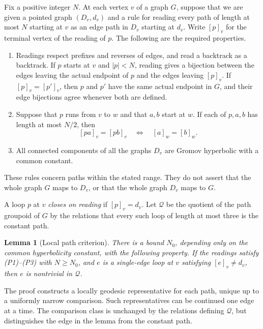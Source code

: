 \documentclass[11pt,reqno]{amsart}
\numberwithin{equation}{section}
\newtheorem{lemma}[theorem]{Lemma}
\theoremstyle{definition}
\theoremstyle{remark}
\begin{document}
Fix a positive integer $N$.  At each vertex $v$ of a graph $G$, suppose that
we are given a pointed graph $(D_v,d_v)$ and a rule for reading every path
of length at most $N$ starting at $v$ as an edge path in $D_v$ starting at
$d_v$.  Write $[p]_v$ for the terminal vertex of the reading of $p$.
The following are the required properties.
\begin{enumerate}
\item[\textnormal{(P1)}] Readings respect prefixes and reverses of edges,
and read a backtrack as a backtrack.  If $p$ starts at $v$ and $|p|<N$,
reading gives a bijection between the edges leaving the actual endpoint of
$p$ and the edges leaving $[p]_v$.  If $[p]_v=[p']_v$, then $p$ and $p'$
have the same actual endpoint in $G$, and their edge bijections agree
whenever both are defined.
\item[\textnormal{(P2)}] Suppose that $p$ runs from $v$ to $w$ and that
$a,b$ start at $w$.  If each of $p,a,b$ has length at most $N/2$, then
\begin{equation}\label{path:change-root}
 [pa]_v=[pb]_v\quad\Longleftrightarrow\quad [a]_w=[b]_w.
\end{equation}
\item[\textnormal{(P3)}] All connected components of all the graphs $D_v$
are Gromov hyperbolic with a common constant.
\end{enumerate}
These rules concern paths within the stated range.  They do not assert
that the whole graph $G$ maps to $D_v$, or that the whole graph $D_v$ maps
to $G$.

A loop $p$ at $v$ \emph{closes on reading} if $[p]_v=d_v$.  Let
$\mathcal Q$ be the quotient of the path groupoid of $G$ by the relations
that every such loop of length at most three is the constant path.

\begin{lemma}[Local path criterion]\label{thm:path-lemma}
There is a bound $N_0$, depending only on the common hyperbolicity
constant, with the following property.  If the readings satisfy
\textnormal{(P1)--(P3)} with $N\ge N_0$, and $e$ is a single-edge loop at
$v$ satisfying $[e]_v\ne d_v$, then $e$ is nontrivial in $\mathcal Q$.
\end{lemma}

The proof constructs a locally geodesic representative for each path,
unique up to a uniformly narrow comparison.  Such representatives can be
continued one edge at a time.  The comparison class is unchanged by the
relations defining $\mathcal Q$, but distinguishes the edge in the lemma
from the constant path.
\end{document}
